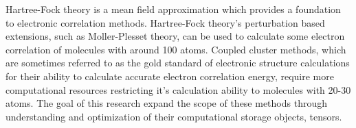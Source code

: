	Hartree-Fock theory is a mean field approximation which provides a foundation to electronic correlation methods. Hartree-Fock theory's perturbation based extensions, such as M{\/o}ller-Plesset theory, can be used to calculate some electron correlation of molecules with around 100 atoms.  Coupled cluster methods, which are sometimes referred to as the gold standard of electronic structure calculations for their ability to calculate accurate electron correlation energy, require more computational resources restricting it's calculation ability to molecules with 20-30 atoms. The goal of this research expand the scope of these methods through understanding and optimization of their computational storage objects, tensors.   %


